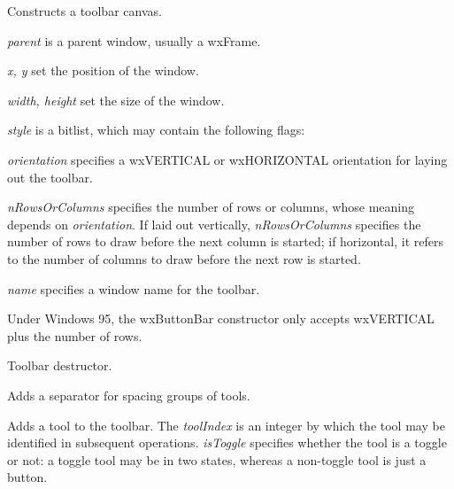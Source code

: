 Constructs a toolbar canvas.

{\it parent} is a parent window, usually a wxFrame.

{\it x, y} set the position of the window.

{\it width, height} set the size of the window.

{\it style} is a bitlist, which may contain the following flags:

\begin{twocollist}\itemsep=0pt
\end{twocollist}

{\it orientation} specifies a wxVERTICAL or wxHORIZONTAL orientation for laying out
the toolbar.

{\it nRowsOrColumns} specifies the number of rows or
columns, whose meaning depends on {\it orientation}.  If laid out
vertically, {\it nRowsOrColumns} specifies the number of rows to draw
before the next column is started; if horizontal, it refers to the
number of columns to draw before the next row is started.

{\it name} specifies a window name for the toolbar.

Under Windows 95, the wxButtonBar constructor only accepts wxVERTICAL
plus the number of rows.



Toolbar destructor.



Adds a separator for spacing groups of tools.



Adds a tool to the toolbar. The {\it toolIndex} is an integer by which
the tool may be identified in subsequent operations.  {\it isToggle}\rtfsp
specifies whether the tool is a toggle or not: a toggle tool may be in
two states, whereas a non-toggle tool is just a button.

